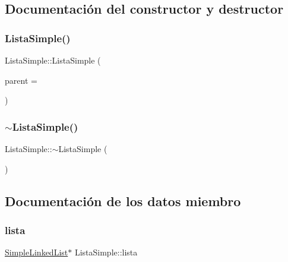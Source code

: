 \subsection{Documentación del constructor y destructor}
\mbox{\label{class_lista_simple_a8fd950a3f4bc90c23a163e9e381081f4}} 
\subsubsection{\texorpdfstring{Lista\+Simple()}{ListaSimple()}}
{\footnotesize\ttfamily Lista\+Simple\+::\+Lista\+Simple (\begin{DoxyParamCaption}\item[{Q\+Widget $\ast$}]{parent = {} }\end{DoxyParamCaption})\hspace{0.3cm}{\ttfamily [explicit]}}

\mbox{\label{class_lista_simple_a44b1edd7d0e73b6e80748c712715e42a}} 
\subsubsection{\texorpdfstring{$\sim$\+Lista\+Simple()}{~ListaSimple()}}
{\footnotesize\ttfamily Lista\+Simple\+::$\sim$\+Lista\+Simple (\begin{DoxyParamCaption}{ }\end{DoxyParamCaption})}



\subsection{Documentación de los datos miembro}
\mbox{\label{class_lista_simple_a46e5f8b712f9569021b223e60acabdaa}} 
\subsubsection{\texorpdfstring{lista}{lista}}
{\footnotesize\ttfamily \mbox{\hyperlink{class_simple_linked_list}{Simple\+Linked\+List}}$\ast$ Lista\+Simple\+::lista}

